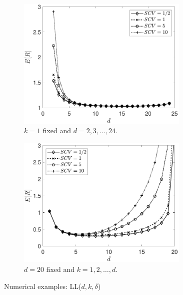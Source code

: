 \documentclass[12pt]{report}
\begin{document}
\begin{figure}[t]
	\begin{center}
	\begin{subfigure}{.44\textwidth}
		\begin{center}
		\includegraphics[width=0.9\textwidth]{figures/Chapter4/plot_ifo_d_LLdk.pdf}
		\caption{$k=1$ fixed and $d=2,3,\dots,24$.}
		\label{fig:LLdk_ifod}
		\end{center}
	\end{subfigure}
	\begin{subfigure}{.44\textwidth}
		\begin{center}
		\includegraphics[width=0.9\textwidth]{figures/Chapter4/plot_ifo_k_LLdk.pdf}
		\caption{$d=20$ fixed and $k=1,2,\dots,d$.}
		\label{fig:LLdk_ifok}
		\end{center}
	\end{subfigure}
	\end{center}
	\caption{Numerical examples: LL($d,k,\delta$)}%
	\label{fig:LLdk}
\end{figure}
\end{document}
